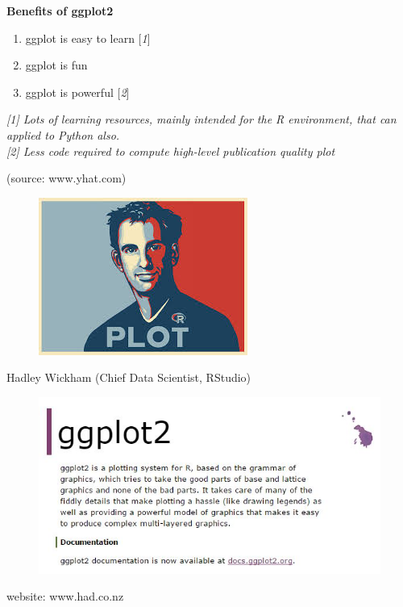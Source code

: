 \documentclass{beamer}
\begin{document}
\begin{frame}
	\Large
	\noindent\textbf{Benefits of ggplot2}
	
	\begin{enumerate}
		\item ggplot is easy to learn [\textit{1}]
		\item ggplot is fun
		\item ggplot is powerful [\textit{2}]
	\end{enumerate}
	
	\begin{framed}
		\textit{[1] Lots of learning resources, mainly intended for the R environment, that can applied to Python also.}\\
		\bigskip
		\textit{[2] Less code required to compute high-level publication quality plot}
	\end{framed}
	(source: www.yhat.com)
\end{frame}	
\begin{frame}
	\begin{figure}
		\centering
		\includegraphics[width=0.95\linewidth]{HW}
	\end{figure}
	Hadley Wickham (Chief Data Scientist, RStudio)
\end{frame}
\begin{frame}
	\begin{figure}
\centering
\includegraphics[width=1.15\linewidth]{ggplot2-website}
\end{figure}
website: www.had.co.nz

\end{frame}
\end{document}
